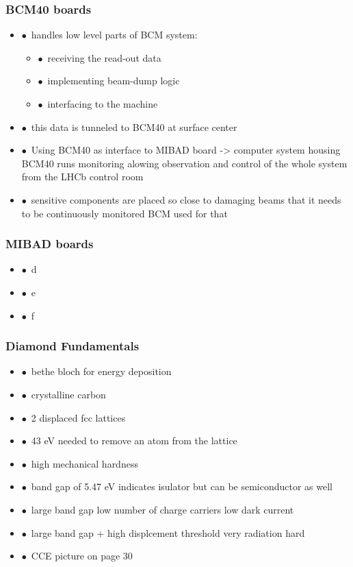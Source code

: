 \documentclass[aspectratio=1610, 12pt, xcolor=dvipsnames]{beamer}
\begin{document}
\begin{frame}\frametitle{BCM40 boards}
  \begin{itemize}
    \item $\bullet$\, handles low level parts of BCM system:
    \begin{itemize}
      \item $\bullet$\, receiving the read-out data
      \item $\bullet$\, implementing beam-dump logic
      \item $\bullet$\, interfacing to the machine
    \end{itemize}
    \item $\bullet$\, this data is tunneled to BCM40 at surface center
    \item $\bullet$\, Using BCM40 as interface to MIBAD board -> computer system housing BCM40 runs monitoring alowing observation and control of the whole system from
the LHCb control room
    \item $\bullet$\, \to sensitive components are placed so close to damaging beams that it needs to be continuously monitored \to BCM used for that
  \end{itemize}
\end{frame}

\begin{frame}\frametitle{MIBAD boards}
  \begin{itemize}
    \item $\bullet$\, d
    \item $\bullet$\, e
    \item $\bullet$\, f
  \end{itemize}
\end{frame}

\begin{frame}\frametitle{Diamond Fundamentals}
  \begin{itemize}
    \item $\bullet$\, bethe bloch for energy deposition
    \item $\bullet$\, crystalline carbon
    \item $\bullet$\, 2 displaced fcc lattices
    \item $\bullet$\, 43 eV needed to remove an atom from the lattice
    \item $\bullet$\, high mechanical hardness
    \item $\bullet$\, band gap of 5.47 eV indicates isulator but can be semiconductor as well
    \item $\bullet$\, large band gap \to low number of charge carriers \to low dark current
    \item $\bullet$\, large band gap + high displcement threshold \to very radiation hard
    \item $\bullet$\, CCE picture on page 30
  \end{itemize}
\end{frame}
\end{document}
